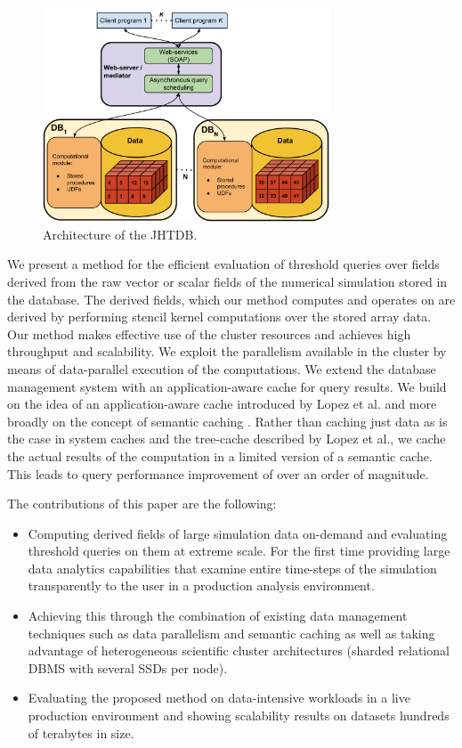 \documentclass{sig-alternate}
\begin{document}
\begin{figure}
\centering
\includegraphics[width=3.35in]{Figures/jhtdb_diagram.pdf}
\caption{Architecture of the JHTDB.}
\label{fig:jhtdb_diagram}
\end{figure}

We present a method for the efficient evaluation of threshold queries over fields derived from the raw vector or scalar fields of the numerical simulation 
stored in the database. The derived fields, which our method computes and operates on are derived by performing stencil kernel computations over the 
stored array data.
Our method makes effective use of the cluster resources and achieves high throughput and scalability. 
We exploit the parallelism 
available in the cluster by means of data-parallel execution of the computations. 
We extend the database management system with an
application-aware cache for query results. We build on the idea of an application-aware cache introduced by Lopez et al. \cite{Lopez} and more broadly 
on the concept of semantic caching \cite{Dar}. Rather than caching just data as is the case in system caches and the tree-cache described by Lopez et al.,
we cache the actual results of the computation in a limited version of a semantic cache. 
This leads to query performance improvement of over an order of magnitude.

The contributions of this paper are the following:
\begin{itemize}
\item Computing derived fields of large simulation data on-demand and evaluating threshold queries on them at extreme scale. For the first time providing large
data analytics capabilities that examine entire time-steps of the simulation transparently to the user in a production analysis environment.
\item Achieving this through the combination of existing data management techniques such as data parallelism and semantic caching as well as taking
advantage of heterogeneous scientific cluster architectures (sharded relational DBMS with several SSDs per node).
\item Evaluating the proposed method on data-intensive workloads in a live production environment and showing scalability results on datasets hundreds of terabytes in size.
\end{itemize}
\end{document}
